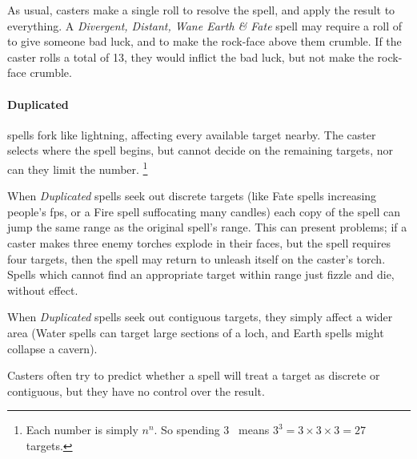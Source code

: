 \begin{multicols}{2}
As usual, casters make a single roll to resolve the spell, and apply the result to everything.
A \textit{Divergent, Distant, Wane Earth \& Fate} spell may require a roll of \tn[7] to give someone bad luck, and \tn[14] to make the rock-face above them crumble.
If the caster rolls a total of 13, they would inflict the bad luck, but not make the rock-face crumble.

\paragraph{Duplicated}
\label{duplicatedDesc}
spells fork like lightning, affecting every available target nearby.
The caster selects where the spell begins, but cannot decide on the remaining targets, nor can they limit the number.%
\footnote{Each number is simply $n^n$.  So spending 3~ means $3^3 = 3\times 3\times 3 = 27$ targets.}

When \textit{Duplicated} spells seek out discrete targets (like Fate spells increasing people's \glspl{fp}, or a Fire spell suffocating many candles) each copy of the spell can jump the same range as the original spell's range.
This can present problems; if a caster makes three enemy torches explode in their faces, but the spell requires four targets, then the spell may return to unleash itself on the caster's torch.
Spells which cannot find an appropriate target within range just fizzle and die, without effect.


When \textit{Duplicated} spells seek out contiguous targets, they simply affect a wider area
(Water spells can target large sections of a loch, and Earth spells might collapse a cavern).

Casters often try to predict whether a spell will treat a target as discrete or contiguous, but they have no control over the result.


\end{multicols}
